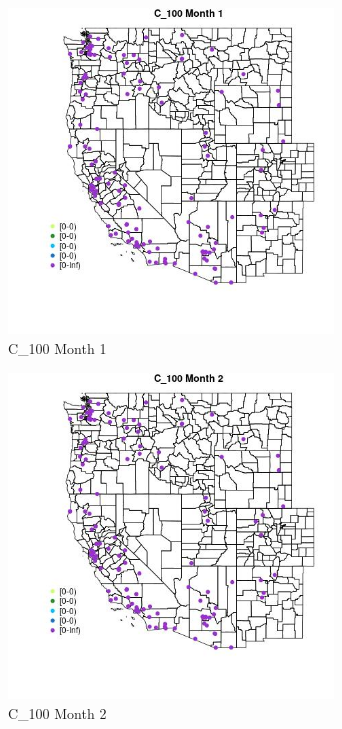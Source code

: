 \begin{figure} 
\centering  
\includegraphics[width=0.77\textwidth]{Code_Outputs/Report_ML_input_PM25_Step4_part_e_de_duplicated_aves_MapObsMo1C_100.jpg} 
\caption{\label{fig:Report_ML_input_PM25_Step4_part_e_de_duplicated_avesMapObsMo1C_100}C_100 Month 1} 
\end{figure} 
 

\begin{figure} 
\centering  
\includegraphics[width=0.77\textwidth]{Code_Outputs/Report_ML_input_PM25_Step4_part_e_de_duplicated_aves_MapObsMo2C_100.jpg} 
\caption{\label{fig:Report_ML_input_PM25_Step4_part_e_de_duplicated_avesMapObsMo2C_100}C_100 Month 2} 
\end{figure} 
 

